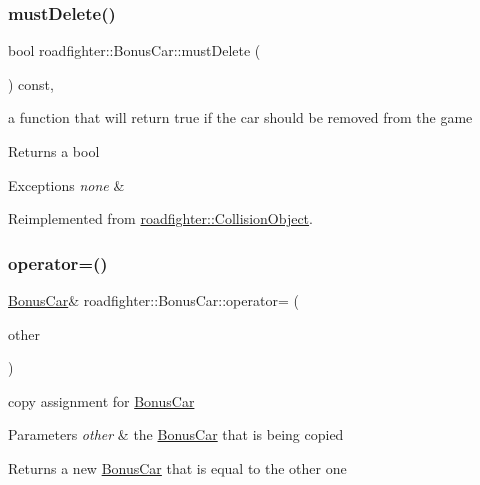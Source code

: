 \subsubsection{\texorpdfstring{must\+Delete()}{mustDelete()}}
{\footnotesize\ttfamily bool roadfighter\+::\+Bonus\+Car\+::must\+Delete (\begin{DoxyParamCaption}{ }\end{DoxyParamCaption}) const\hspace{0.3cm}{\ttfamily [override]}, {\ttfamily [virtual]}}

a function that will return true if the car should be removed from the game \begin{DoxyReturn}{Returns}
a bool 
\end{DoxyReturn}

\begin{DoxyExceptions}{Exceptions}
{\em none} & \\
\hline
\end{DoxyExceptions}


Reimplemented from \hyperlink{classroadfighter_1_1CollisionObject_a738071cd7b1b8cd4c8d455b5e552bd4c}{roadfighter\+::\+Collision\+Object}.

\mbox{\label{classroadfighter_1_1BonusCar_acd5303a50571433116089c1f63ab0a9e}} 
\subsubsection{\texorpdfstring{operator=()}{operator=()}\hspace{0.1cm}{\footnotesize\ttfamily [1/2]}}
{\footnotesize\ttfamily \hyperlink{classroadfighter_1_1BonusCar}{Bonus\+Car}\& roadfighter\+::\+Bonus\+Car\+::operator= (\begin{DoxyParamCaption}\item[{const \hyperlink{classroadfighter_1_1BonusCar}{Bonus\+Car} \&}]{other }\end{DoxyParamCaption})\hspace{0.3cm}{\ttfamily [default]}}

copy assignment for \hyperlink{classroadfighter_1_1BonusCar}{Bonus\+Car} 
\begin{DoxyParams}{Parameters}
{\em other} & the \hyperlink{classroadfighter_1_1BonusCar}{Bonus\+Car} that is being copied \\
\hline
\end{DoxyParams}
\begin{DoxyReturn}{Returns}
a new \hyperlink{classroadfighter_1_1BonusCar}{Bonus\+Car} that is equal to the other one 
\end{DoxyReturn}
\mbox{\label{classroadfighter_1_1BonusCar_a9fd4f5d8559cd48aa408ff032b92c9f4}} 

